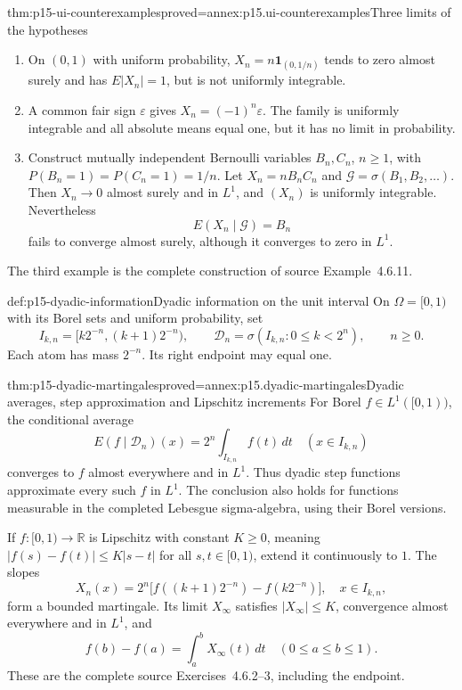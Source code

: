 \begin{hbtheorem}{thm:p15-ui-counterexamples}{proved=annex:p15.ui-counterexamples}{Three limits of the hypotheses}
\begin{enumerate}
\item On \((0,1)\) with uniform probability,
      \(X_n=n\mathbf1_{(0,1/n)}\) tends to zero almost surely and
      has \(E|X_n|=1\), but is not uniformly integrable.
\item A common fair sign \(\varepsilon\) gives
      \(X_n=(-1)^n\varepsilon\). The family is uniformly integrable
      and all absolute means equal one, but it has no limit in probability.
\item Construct mutually independent Bernoulli variables \(B_n,C_n\),
      \(n\geq1\), with
      \(P(B_n=1)=P(C_n=1)=1/n\). Let \(X_n=nB_nC_n\) and
      \(\mathcal G=\sigma(B_1,B_2,\ldots)\). Then \(X_n\to0\)
      almost surely and in \(L^1\), and \((X_n)\) is uniformly integrable.
      Nevertheless
      \[
                      E(X_n\mid\mathcal G)=B_n
      \]
      fails to converge almost surely, although it converges to zero in
      \(L^1\).
\end{enumerate}
The third example is the complete construction of source Example~4.6.11.
\end{hbtheorem}

\begin{hbdefinition}{def:p15-dyadic-information}{Dyadic information on the unit interval}
On \(\Omega=[0,1)\) with its Borel sets and uniform probability, set
\[
 I_{k,n}=[k2^{-n},(k+1)2^{-n}),\qquad
 \mathcal D_n=\sigma(I_{k,n}:0\leq k<2^n),\qquad n\geq0.
\]
Each atom has mass \(2^{-n}\). Its right endpoint may equal one.
\end{hbdefinition}

\begin{hbtheorem}{thm:p15-dyadic-martingales}{proved=annex:p15.dyadic-martingales}{Dyadic averages, step approximation and Lipschitz increments}
For Borel \(f\in L^1([0,1))\), the conditional average
\[
       E(f\mid\mathcal D_n)(x)=
                2^n\int_{I_{k,n}}f(t)\,dt\quad(x\in I_{k,n})
\]
converges to \(f\) almost everywhere and in \(L^1\).
Thus dyadic step functions approximate every such \(f\) in \(L^1\).
The conclusion also holds for functions measurable in the completed
Lebesgue sigma-algebra, using their Borel versions.

If \(f:[0,1)\to\mathbb R\) is Lipschitz with constant \(K\geq0\), meaning
\(|f(s)-f(t)|\leq K|s-t|\) for all \(s,t\in[0,1)\), extend it
continuously to \(1\). The slopes
\[
       X_n(x)=2^n\bigl[f((k+1)2^{-n})-f(k2^{-n})\bigr],
                         \quad x\in I_{k,n},
\]
form a bounded martingale. Its limit \(X_\infty\) satisfies
\(|X_\infty|\leq K\), convergence almost everywhere and in \(L^1\), and
\[
             f(b)-f(a)=\int_a^b X_\infty(t)\,dt
                                  \quad(0\leq a\leq b\leq1).
\]
These are the complete source Exercises~4.6.2--3, including the endpoint.
\end{hbtheorem}

